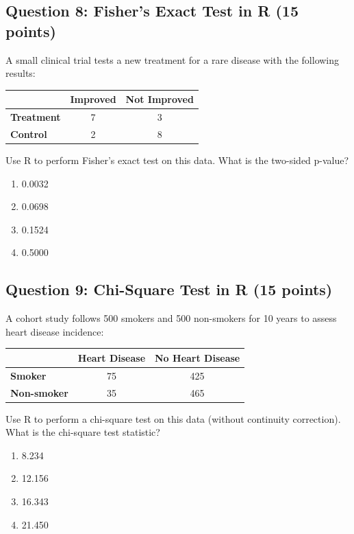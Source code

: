 \documentclass[11pt]{article}
\begin{document}
\subsection*{Question 8: Fisher's Exact Test in R (15 points)}

A small clinical trial tests a new treatment for a rare disease with the following results:

\begin{center}
\begin{tabular}{l|cc}
& \textbf{Improved} & \textbf{Not Improved} \\
\hline
\textbf{Treatment} & 7 & 3 \\
\textbf{Control} & 2 & 8 \\
\end{tabular}
\end{center}

Use R to perform Fisher's exact test on this data. What is the two-sided p-value?

\begin{enumerate}[label=\Alph*.]
\item 0.0032
\item 0.0698
\item 0.1524
\item 0.5000
\end{enumerate}

\vspace{1cm}

\subsection*{Question 9: Chi-Square Test in R (15 points)}

A cohort study follows 500 smokers and 500 non-smokers for 10 years to assess heart disease incidence:

\begin{center}
\begin{tabular}{l|cc}
& \textbf{Heart Disease} & \textbf{No Heart Disease} \\
\hline
\textbf{Smoker} & 75 & 425 \\
\textbf{Non-smoker} & 35 & 465 \\
\end{tabular}
\end{center}

Use R to perform a chi-square test on this data (without continuity correction). What is the chi-square test statistic?

\begin{enumerate}[label=\Alph*.]
\item 8.234
\item 12.156
\item 16.343
\item 21.450
\end{enumerate}
\end{document}
